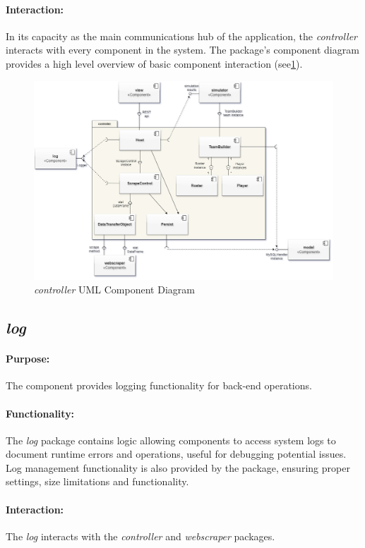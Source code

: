 \documentclass{thesis-ekf}
\theoremstyle{definition}
\theoremstyle{remark}
\begin{document}
\paragraph{Interaction:}
In its capacity as the main communications hub of the application, the \emph{controller} interacts with every component in the system. The package's component diagram provides a high level overview of basic component interaction (see{\ref{img-controller-component}}).
\begin{figure}[th!]
	\centering
	\includegraphics[width=1\linewidth]{img/component/component_controller}
	\caption{\emph{controller} UML Component Diagram}
	\label{img-controller-component}
\end{figure}

\subsection{\emph{log}}
\paragraph{Purpose:}
The component provides logging functionality for back-end operations.
\paragraph{Functionality:}
The \emph{log} package contains logic allowing components to access system logs to document runtime errors and operations, useful for debugging potential issues. Log management functionality is also provided by the package, ensuring proper settings, size limitations and functionality.
\paragraph{Interaction:}
The \emph{log} interacts with the \emph{controller} and \emph{webscraper} packages.
\end{document}

